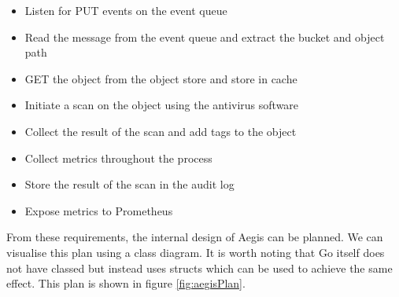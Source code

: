 \documentclass[12pt, conference, final, a4paper, onecolumn, compsoc]{IEEEtran}
\begin{document}
\begin{itemize}
  \item Listen for PUT events on the event queue
  \item Read the message from the event queue and extract the bucket and object
        path
  \item GET the object from the object store and store in cache
  \item Initiate a scan on the object using the antivirus software
  \item Collect the result of the scan and add tags to the object
  \item Collect metrics throughout the process
  \item Store the result of the scan in the audit log
  \item Expose metrics to Prometheus
\end{itemize}

From these requirements, the internal design of Aegis can be planned. We can
visualise this plan using a class diagram. It is worth noting that Go itself
does not have classed but instead uses structs which can be used to achieve the
same effect. This plan is shown in figure \ref{fig:aegisPlan}.
\end{document}
